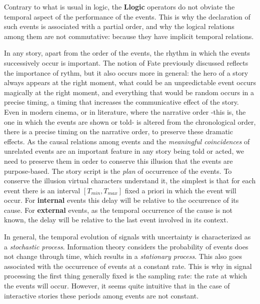 \documentclass[
		twoside,openright,titlepage,numbers=noenddot,manychapters,
		headinclude,%
                footinclude=false,cleardoublepage=empty,
                BCOR=5mm,
		fontsize=11pt, %
                 enabledeprecatedfontcommands]{scrreprt}
\begin{document}
Contrary to what is usual in logic, the \textbf{Llogic} operators do not obviate the temporal aspect of the performance of the events. This is why the declaration of such events is associated with a partial order, and why the logical relations among them are not commutative: because they have implicit temporal relations. 

In any story, apart from the order of the events, the rhythm in which the events successively occur is important. The notion of Fate previously discussed %
reflects the importance of rythm, but it also occurs more in general: the hero of a story always appears at the right moment, what could be an unpredictable event occurs magically at the right moment, and everything that would be random occurs in a precise timing, a timing that increases the communicative effect of the story. Even in modern cinema, or in literature, where the narrative order -this is, the one in which the events are shown or told- is altered from the chronological order, there is a precise timing on the narrative order, to preserve these dramatic effects. As the causal relations among events and the \emph{meaningful coincidences} of unrelated events are an important feature in any story being told or acted, we need to preserve them in order to conserve this illusion that the events are purpose-based. The story script is the \emph{plan} of occurrence of the events. To conserve the illusion virtual characters understand it, the simplest is  that for each event there is an interval $[T_{min}, T_{max}]$ fixed a priori in which the event will occur. For \textbf{internal} events this delay will be relative to the occurrence of its cause. For \textbf{external} events, as the temporal occurrence of the cause is not known, the delay will be relative  to the last event involved in its context.  


In general, the temporal evolution of signals with uncertainty is characterized as a \emph{stochastic process}. Information theory considers the probability of events does not change through time, which results in a \emph{stationary process}. This also goes associated with the occurrence of events at a constant rate. This is why in signal processing the first thing generally fixed is the sampling rate: the rate at which the events will occur. However, it seems quite intuitive that in the case of interactive stories these periods among events are not constant. 
\end{document}
